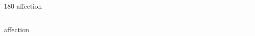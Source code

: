 
\begin{frame}
\begin{center}
\begin{turn}{180}
{\fontsize{2.5cm}{1em}\selectfont affection}
\end{turn}
\vspace{1em}\par  
\hrule
\vspace{1em}\par  
{\fontsize{2.5cm}{1em}\selectfont affection}
\end{center}
\end{frame}
